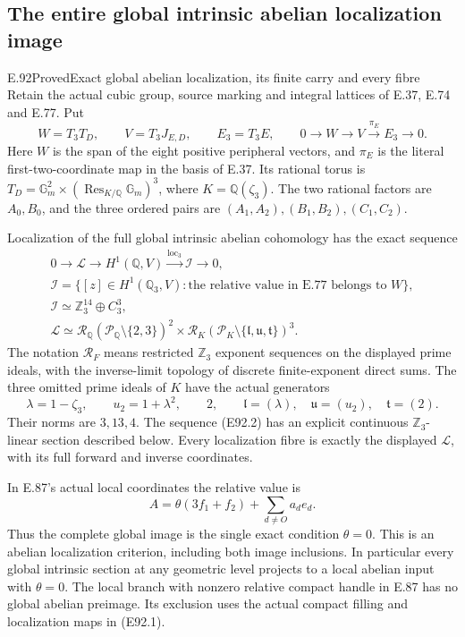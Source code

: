 \subsection{The entire global intrinsic abelian localization image}

\begin{statement}{E.92}{Proved}{Exact global abelian localization, its finite carry and every fibre}
Retain the actual cubic group, source marking and
integral lattices of E.37, E.74 and E.77. Put
\[
 W=T_3T_D,\qquad V=T_3J_{E,D},\qquad E_3=T_3E,
 \qquad0\longrightarrow W\longrightarrow V
                       \xrightarrow{\pi_E}E_3\longrightarrow0.
 \tag{E92.1}
\]
Here $W$ is the span of the eight positive peripheral
vectors, and $\pi_E$ is the literal first-two-coordinate
map in the basis of E.37. Its rational torus is
$T_D=\mathbb G_m^2\times(\operatorname{Res}_{K/\mathbb Q}\mathbb G_m)^3$,
where $K=\mathbb Q(\zeta_3)$. The two rational factors
are $A_0,B_0$, and the three ordered pairs are
$(A_1,A_2),(B_1,B_2),(C_1,C_2)$.

Localization of the full global intrinsic abelian
cohomology has the exact sequence
\[
\begin{gathered}
0\longrightarrow\mathscr L
 \longrightarrow H^1(\mathbb Q,V)
 \xrightarrow{\operatorname{loc}_3}\mathcal I
 \longrightarrow0,\\
\mathcal I=
 \{[z]\in H^1(\mathbb Q_3,V):
      \text{the relative value in E.77 belongs to }W\},\\
\mathcal I\simeq\mathbb Z_3^{14}\oplus C_3^3,\\
\mathscr L\simeq
 \mathscr R_{\mathbb Q}(\mathcal P_{\mathbb Q}\setminus\{2,3\})^2
 \times
 \mathscr R_K(\mathcal P_K\setminus\{\mathfrak l,\mathfrak u,\mathfrak t\})^3.
\end{gathered}
 \tag{E92.2}
\]
The notation $\mathscr R_F$ means restricted
$\mathbb Z_3$ exponent sequences on the displayed
prime ideals, with the inverse-limit topology of
discrete finite-exponent direct sums. The three
omitted prime ideals of $K$ have the actual generators
\[
 \lambda=1-\zeta_3,\qquad u_2=1+\lambda^2,
 \qquad2,\qquad
 \mathfrak l=(\lambda),\quad\mathfrak u=(u_2),\quad
 \mathfrak t=(2).
 \tag{E92.3}
\]
Their norms are $3,13,4$. The sequence (E92.2)
has an explicit continuous $\mathbb Z_3$-linear
section described below. Every localization fibre
is exactly the displayed $\mathscr L$, with its
full forward and inverse coordinates.

In E.87's actual local coordinates the relative
value is
\[
 A=\theta(3f_1+f_2)+\sum_{d\ne O}a_d e_d.
 \tag{E92.4}
\]
Thus the complete global image is the single exact
condition $\theta=0$. This is an abelian localization
criterion, including both image inclusions. In
particular every global intrinsic section at any
geometric level projects to a local abelian input
with $\theta=0$. The local branch with nonzero
relative compact handle in E.87 has no global
abelian preimage. Its exclusion uses the actual
compact filling and localization maps in (E92.1).


\end{statement}
